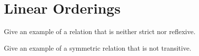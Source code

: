 \chapter{Linear Orderings}

\begin{exercise}
	Give an example of a relation that is neither strict nor reflexive.
\end{exercise}

\begin{exercise}
	Give an example of a symmetric relation that is not transitive.
\end{exercise}
